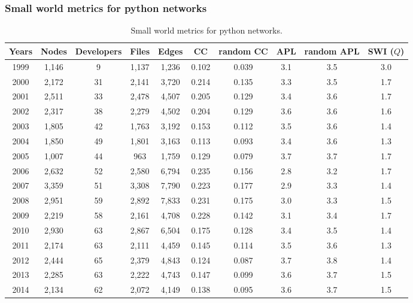 \documentclass[ignorenonframetext,red,8pt,notes=hide]{beamer}
\begin{document}
\begin{frame}
\frametitle{Small world metrics for python networks}
\begin{table}[H]
\begin{center}
\begin{footnotesize}
\begin{tabular}{|c|c|c|c|c|c|c|c|c|c|}
\hline
Years&Nodes&Developers&Files&Edges&CC&random CC&APL&random APL&SWI ($Q$)\\
\hline
1999&1,146&9&1,137&1,236&0.102&0.039&3.1&3.5&3.0\\
2000&2,172&31&2,141&3,720&0.214&0.135&3.3&3.5&1.7\\
2001&2,511&33&2,478&4,507&0.205&0.129&3.4&3.6&1.7\\
2002&2,317&38&2,279&4,502&0.204&0.129&3.6&3.6&1.6\\
2003&1,805&42&1,763&3,192&0.153&0.112&3.5&3.6&1.4\\
2004&1,850&49&1,801&3,163&0.113&0.093&3.4&3.6&1.3\\
2005&1,007&44&963&1,759&0.129&0.079&3.7&3.7&1.7\\
2006&2,632&52&2,580&6,794&0.235&0.156&2.8&3.2&1.7\\
2007&3,359&51&3,308&7,790&0.223&0.177&2.9&3.3&1.4\\
2008&2,951&59&2,892&7,833&0.231&0.175&3.0&3.3&1.5\\
2009&2,219&58&2,161&4,708&0.228&0.142&3.1&3.4&1.7\\
2010&2,930&63&2,867&6,504&0.175&0.128&3.4&3.5&1.4\\
2011&2,174&63&2,111&4,459&0.145&0.114&3.5&3.6&1.3\\
2012&2,444&65&2,379&4,843&0.124&0.087&3.7&3.8&1.4\\
2013&2,285&63&2,222&4,743&0.147&0.099&3.6&3.7&1.5\\
2014&2,134&62&2,072&4,149&0.138&0.095&3.6&3.7&1.5\\
\hline
\end{tabular}
\caption{Small world metrics for python networks.}
\label{swi_python}
\end{footnotesize}
\end{center}
\end{table}


\end{frame}


\end{document}
